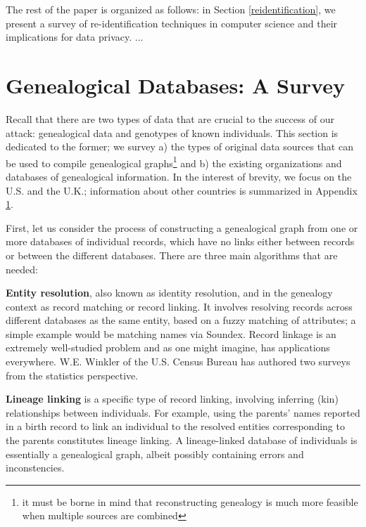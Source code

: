 \documentclass{article}
\begin{document}
The rest of the paper is organized as follows: in Section \ref{reidentification}, we present a survey of re-identification techniques in computer science and their implications for data privacy. ...







\section{Genealogical Databases: A Survey}
Recall that there are two types of data that are crucial to the success of our attack: genealogical data and  genotypes of known individuals. This section is dedicated to the former; we survey a) the types of original data sources that can be used to compile genealogical graphs\footnote{it must be borne in mind that reconstructing genealogy is much more feasible when multiple sources are combined} and b) the existing organizations and databases of genealogical information. 
In the interest of brevity, we focus on the U.S. and the U.K.; information about other countries is summarized in Appendix \ref{}.

First, let us consider the process of constructing a genealogical graph from one or more databases of individual records, which have no links either between records or between the different databases.  There are three main algorithms that are needed:

{\bf Entity resolution}, also known as identity resolution, and in the genealogy context as record matching or record linking. It involves resolving records across different databases as the same entity, based on a fuzzy matching of attributes; a simple example would be matching names via Soundex. Record linkage is an extremely well-studied problem and as one might imagine, has applications everywhere. W.E. Winkler of the U.S. Census Bureau has authored two surveys \cite{winkler-survey-99,winkler-survey-06} from the statistics perspective.

{\bf Lineage linking} is a specific type of record linking, involving inferring (kin) relationships between individuals. For example, using the parents' names reported in a birth record to link an individual to the resolved entities corresponding to the parents constitutes lineage linking. A lineage-linked database of individuals is essentially a genealogical graph, albeit possibly containing errors and inconstencies.
\end{document}
